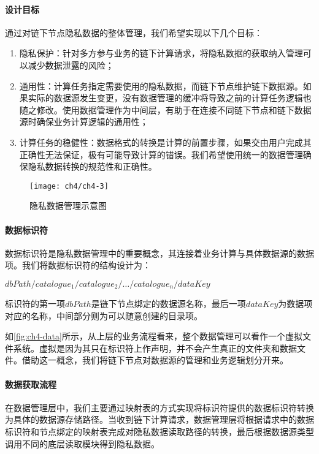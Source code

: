 \paragraph{设计目标} 通过对链下节点隐私数据的整体管理，我们希望实现以下几个目标：
\begin{enumerate}
    \setlength{\itemsep}{0pt}
    \setlength{\parsep}{0pt}
    \setlength{\parskip}{0pt}
    \item 隐私保护：针对多方参与业务的链下计算请求，将隐私数据的获取纳入管理可以减少数据泄露的风险；
    \item 通用性：计算任务指定需要使用的隐私数据，而链下节点维护链下数据源。如果实际的数据源发生变更，没有数据管理的缓冲将导致之前的计算任务逻辑也随之修改。使用数据管理作为中间层，有助于在连接不同链下节点和链下数据源时确保业务计算逻辑的通用性；
    \item 计算任务的稳健性：数据格式的转换是计算的前置步骤，如果交由用户完成其正确性无法保证，极有可能导致计算的错误。我们希望使用统一的数据管理确保隐私数据转换的规范性和正确性。
\end{enumerate}

\begin{figure}[htbp]
    \centering
    \texttt{[image: ch4/ch4-3]}
    \caption{\label{fig:ch4-data}隐私数据管理示意图}
\end{figure}

\paragraph{数据标识符} 数据标识符是隐私数据管理中的重要概念，其连接着业务计算与具体数据源的数据项。我们将数据标识符的结构设计为：
\begin{center}
    $dbPath/catalogue_1/catalogue_2/\dots/catalogue_n/dataKey$
\end{center}
标识符的第一项$dbPath$是链下节点绑定的数据源名称，最后一项$dataKey$为数据项对应的名称，中间部分则为可以随意创建的目录项。

如\autoref{fig:ch4-data}所示，从上层的业务流程看来，整个数据管理可以看作一个虚拟文件系统。虚拟是因为其只在标识符上作声明，并不会产生真正的文件夹和数据文件。借助这一概念，我们将链下节点对数据源的管理和业务逻辑划分开来。

\paragraph{数据获取流程} 在数据管理层中，我们主要通过映射表的方式实现将标识符提供的数据标识符转换为具体的数据源存储路径。当收到链下计算请求，数据管理层将根据请求中的数据标识符和节点绑定的映射表完成对隐私数据读取路径的转换，最后根据数据源类型调用不同的底层读取模块得到隐私数据。

